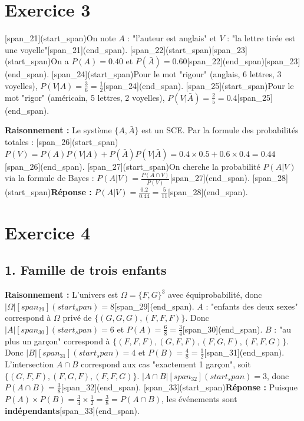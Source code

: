 \documentclass[11pt,a4paper]{article}
\begin{document}
\hrulefill

\section*{Exercice 3}
[span_21](start_span)On note $A$ : "l'auteur est anglais" et $V$ : "la lettre tirée est une voyelle"[span_21](end_span).
[span_22](start_span)[span_23](start_span)On a $P(A) = 0.40$ et $P(\bar{A}) = 0.60$[span_22](end_span)[span_23](end_span).
[span_24](start_span)Pour le mot "rigour" (anglais, 6 lettres, 3 voyelles), $P(V|A) = \frac{3}{6} = \frac{1}{2}$[span_24](end_span).
[span_25](start_span)Pour le mot "rigor" (américain, 5 lettres, 2 voyelles), $P(V|\bar{A}) = \frac{2}{5} = 0.4$[span_25](end_span).

\textbf{Raisonnement :} Le système $\{A, \bar{A}\}$ est un SCE. Par la formule des probabilités totales :
[span_26](start_span)$P(V) = P(A)P(V|A) + P(\bar{A})P(V|\bar{A}) = 0.4 \times 0.5 + 0.6 \times 0.4 = 0.44$[span_26](end_span).
[span_27](start_span)On cherche la probabilité $P(A|V)$ via la formule de Bayes : $P(A|V) = \frac{P(A \cap V)}{P(V)}$[span_27](end_span).
[span_28](start_span)\textbf{Réponse :} $P(A|V) = \frac{0.2}{0.44} = \frac{5}{11}$[span_28](end_span).

\hrulefill

\section*{Exercice 4}

\subsection*{1. Famille de trois enfants}
\textbf{Raisonnement :} L'univers est $\Omega = \{F, G\}^3$ avec équiprobabilité, donc $|\Omega| [span_29](start_span)= 8$[span_29](end_span).
$A$ : "enfants des deux sexes" correspond à $\Omega$ privé de $\{(G,G,G), (F,F,F)\}$. Donc $|A| [span_30](start_span)= 6$ et $P(A) = \frac{6}{8} = \frac{3}{4}$[span_30](end_span).
$B$ : "au plus un garçon" correspond à $\{(F,F,F), (G,F,F), (F,G,F), (F,F,G)\}$. Donc $|B| [span_31](start_span)= 4$ et $P(B) = \frac{4}{8} = \frac{1}{2}$[span_31](end_span).
L'intersection $A \cap B$ correspond aux cas "exactement 1 garçon", soit $\{(G,F,F), (F,G,F), (F,F,G)\}$. $|A \cap B| [span_32](start_span)= 3$, donc $P(A \cap B) = \frac{3}{8}$[span_32](end_span).
[span_33](start_span)\textbf{Réponse :} Puisque $P(A) \times P(B) = \frac{3}{4} \times \frac{1}{2} = \frac{3}{8} = P(A \cap B)$, les événements sont \textbf{indépendants}[span_33](end_span).
\end{document}
